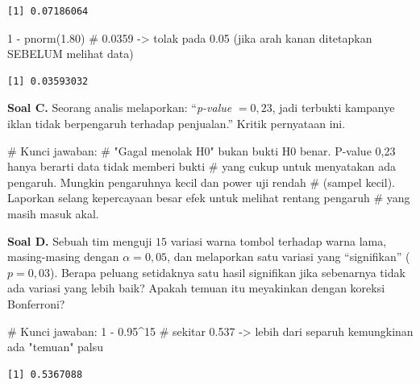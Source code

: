 \documentclass[
  indonesian,
  letterpaper,
]{book}
\newenvironment{Shaded}{\begin{snugshade}}{\end{snugshade}}
\newcommand{\CommentTok}[1]{\textcolor[rgb]{0.37,0.37,0.37}{#1}}
\newcommand{\DecValTok}[1]{\textcolor[rgb]{0.68,0.00,0.00}{#1}}
\newcommand{\FloatTok}[1]{\textcolor[rgb]{0.68,0.00,0.00}{#1}}
\newcommand{\FunctionTok}[1]{\textcolor[rgb]{0.28,0.35,0.67}{#1}}
\newcommand{\NormalTok}[1]{\textcolor[rgb]{0.00,0.23,0.31}{#1}}
\newcommand{\SpecialCharTok}[1]{\textcolor[rgb]{0.37,0.37,0.37}{#1}}
\begin{document}
\begin{verbatim}
[1] 0.07186064
\end{verbatim}

\begin{Shaded}
\begin{Highlighting}[]
\DecValTok{1} \SpecialCharTok{{-}} \FunctionTok{pnorm}\NormalTok{(}\FloatTok{1.80}\NormalTok{) }\CommentTok{\# 0.0359 {-}\textgreater{} tolak pada 0.05 (jika arah kanan ditetapkan SEBELUM melihat data)}
\end{Highlighting}
\end{Shaded}

\begin{verbatim}
[1] 0.03593032
\end{verbatim}

\textbf{Soal C.} Seorang analis melaporkan: ``\emph{p-value}
\(= 0{,}23\), jadi terbukti kampanye iklan tidak berpengaruh terhadap
penjualan.'' Kritik pernyataan ini.

\begin{Shaded}
\begin{Highlighting}[]
\CommentTok{\# Kunci jawaban:}
\CommentTok{\# "Gagal menolak H0" bukan bukti H0 benar. P{-}value 0,23 hanya berarti data tidak memberi bukti}
\CommentTok{\# yang cukup untuk menyatakan ada pengaruh. Mungkin pengaruhnya kecil dan power uji rendah}
\CommentTok{\# (sampel kecil). Laporkan selang kepercayaan besar efek untuk melihat rentang pengaruh}
\CommentTok{\# yang masih masuk akal.}
\end{Highlighting}
\end{Shaded}

\textbf{Soal D.} Sebuah tim menguji \(15\) variasi warna tombol terhadap
warna lama, masing-masing dengan \(\alpha = 0{,}05\), dan melaporkan
satu variasi yang ``signifikan'' (\(p = 0{,}03\)). Berapa peluang
setidaknya satu hasil signifikan jika sebenarnya tidak ada variasi yang
lebih baik? Apakah temuan itu meyakinkan dengan koreksi Bonferroni?

\begin{Shaded}
\begin{Highlighting}[]
\CommentTok{\# Kunci jawaban:}
\DecValTok{1} \SpecialCharTok{{-}} \FloatTok{0.95}\SpecialCharTok{\^{}}\DecValTok{15} \CommentTok{\# sekitar 0.537 {-}\textgreater{} lebih dari separuh kemungkinan ada "temuan" palsu}
\end{Highlighting}
\end{Shaded}

\begin{verbatim}
[1] 0.5367088
\end{verbatim}
\end{document}
